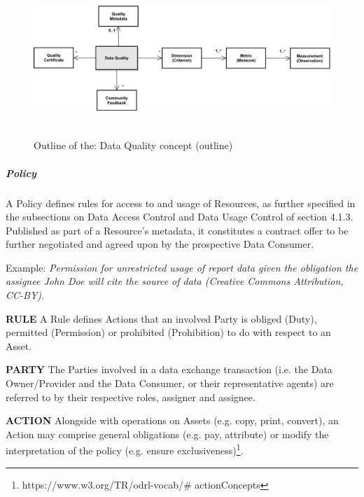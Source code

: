 
\begin{figure}[H]
	\begin{Center}
		\includegraphics[width=6.53in,height=2.31in]{./media/image45.png}
		\caption{Outline of the: Data Quality concept (outline)}
		\label{fig:Outline_of_the_Data_Quality_concept_outline}
	\end{Center}
\end{figure}






\subparagraph*{Policy}
A Policy defines rules for access to and usage of Resources, as further specified in the subsections on Data Access Control and Data Usage Control of section 4.1.3.
Published as part of a Resource’s metadata, it constitutes a contract offer to be further negotiated and agreed upon by the prospective Data Consumer. 

Example: \textit{Permission for unrestricted usage of report data given the obligation the assignee John Doe will cite the source of data (Creative Commons Attribution, CC-BY)}.

\textbf{RULE} A Rule defines Actions that an involved Party is obliged (Duty), permitted (Permission) or prohibited (Prohibition) to do with respect to an Asset.

\textbf{PARTY }The Parties involved in a data exchange transaction (i.e. the Data Owner/Provider and the Data Consumer, or their representative agents) are referred to by their respective roles, assigner and assignee. 

\textbf{ACTION} Alongside with operations on Assets (e.g. copy, print, convert), an Action may comprise general obligations (e.g. pay, attribute) or modify the interpretation of the policy (e.g. ensure exclusiveness)\footnote{https://www.w3.org/TR/odrl-vocab/$\#$ actionConcepts }. 

